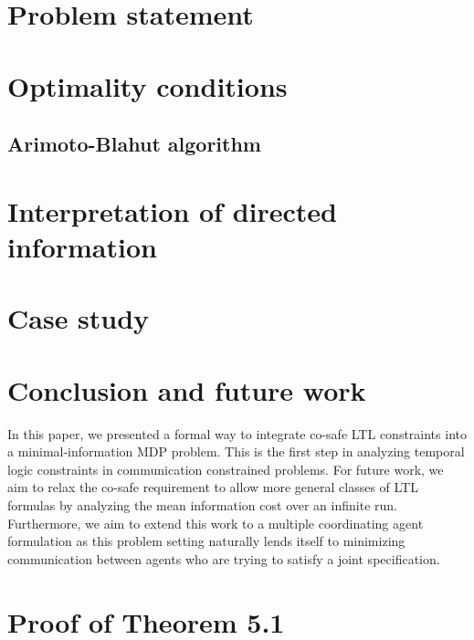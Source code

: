 \documentclass[letterpaper, 10 pt, conference]{ieeeconf}  %
\begin{document}





\section{Problem statement}








\section{Optimality conditions}



\subsection{Arimoto-Blahut algorithm}


\section{Interpretation of directed information}\label{sec:ab}



\section{Case study}


\section{Conclusion and future work}
In this paper, we presented a formal way to integrate co-safe LTL constraints into a minimal-information MDP problem. This is the first step in analyzing temporal logic constraints in communication constrained problems. For future work, we aim to relax the co-safe requirement to allow more general classes of LTL formulas by analyzing the mean information cost over an infinite run. Furthermore, we aim to extend this work to a multiple coordinating agent formulation as this problem setting naturally lends itself to minimizing communication between agents who are trying to satisfy a joint specification. 






\appendices

\section{Proof of Theorem 5.1} \label{sec:prf}
%
\end{document}
